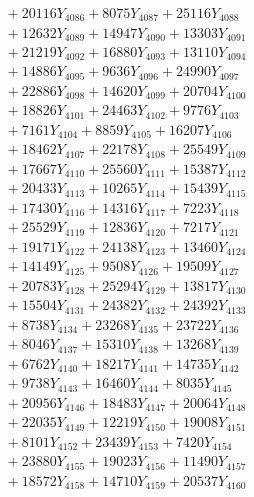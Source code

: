 \documentclass[a4paper,10pt]{article}
\begin{document}
{\begin{align}
&\;  + 20116 Y_{4086} + 8075 Y_{4087} + 25116 Y_{4088} \\[0.3ex]
&\;  + 12632 Y_{4089} + 14947 Y_{4090} + 13303 Y_{4091} \\[0.3ex]
&\;  + 21219 Y_{4092} + 16880 Y_{4093} + 13110 Y_{4094} \\[0.3ex]
&\;  + 14886 Y_{4095} + 9636 Y_{4096} + 24990 Y_{4097} \\[0.3ex]
&\;  + 22886 Y_{4098} + 14620 Y_{4099} + 20704 Y_{4100} \\[0.3ex]
&\;  + 18826 Y_{4101} + 24463 Y_{4102} + 9776 Y_{4103} \\[0.3ex]
&\;  + 7161 Y_{4104} + 8859 Y_{4105} + 16207 Y_{4106} \\[0.3ex]
&\;  + 18462 Y_{4107} + 22178 Y_{4108} + 25549 Y_{4109} \\[0.5ex]\allowbreak
&\;  + 17667 Y_{4110} + 25560 Y_{4111} + 15387 Y_{4112} \\[0.3ex]
&\;  + 20433 Y_{4113} + 10265 Y_{4114} + 15439 Y_{4115} \\[0.3ex]
&\;  + 17430 Y_{4116} + 14316 Y_{4117} + 7223 Y_{4118} \\[0.3ex]
&\;  + 25529 Y_{4119} + 12836 Y_{4120} + 7217 Y_{4121} \\[0.3ex]
&\;  + 19171 Y_{4122} + 24138 Y_{4123} + 13460 Y_{4124} \\[0.3ex]
&\;  + 14149 Y_{4125} + 9508 Y_{4126} + 19509 Y_{4127} \\[0.3ex]
&\;  + 20783 Y_{4128} + 25294 Y_{4129} + 13817 Y_{4130} \\[0.3ex]
&\;  + 15504 Y_{4131} + 24382 Y_{4132} + 24392 Y_{4133} \\[0.3ex]
&\;  + 8738 Y_{4134} + 23268 Y_{4135} + 23722 Y_{4136} \\[0.3ex]
&\;  + 8046 Y_{4137} + 15310 Y_{4138} + 13268 Y_{4139} \\[0.5ex]\allowbreak
&\;  + 6762 Y_{4140} + 18217 Y_{4141} + 14735 Y_{4142} \\[0.3ex]
&\;  + 9738 Y_{4143} + 16460 Y_{4144} + 8035 Y_{4145} \\[0.3ex]
&\;  + 20956 Y_{4146} + 18483 Y_{4147} + 20064 Y_{4148} \\[0.3ex]
&\;  + 22035 Y_{4149} + 12219 Y_{4150} + 19008 Y_{4151} \\[0.3ex]
&\;  + 8101 Y_{4152} + 23439 Y_{4153} + 7420 Y_{4154} \\[0.3ex]
&\;  + 23880 Y_{4155} + 19023 Y_{4156} + 11490 Y_{4157} \\[0.3ex]
&\;  + 18572 Y_{4158} + 14710 Y_{4159} + 20537 Y_{4160} \\[0.3ex]

\end{align}}
\end{document}
